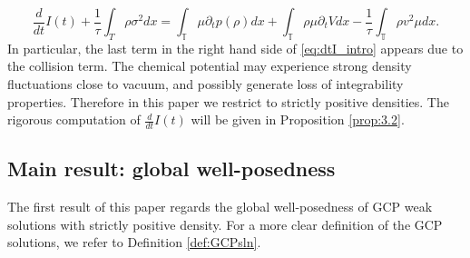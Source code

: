 \documentclass[leqno]{amsart}
\theoremstyle{plain}
\theoremstyle{definition}
\theoremstyle{remark}
\theoremstyle{plain}
\theoremstyle{plain}
\def\T{{\mathbb T}}%
\def\d{{\partial}}
\numberwithin{equation}{section}
\begin{document}
\begin{equation}\label{eq:dtI_intro}
\frac{d}{dt} I(t)+\frac{1}{\tau}\int_T\rho \sigma^2 dx=\int_\T \mu\d_tp(\rho)dx+\int_\T\rho\mu \d_tVdx-\frac{1}{\tau}\int_\T\rho v^2\mu dx.
\end{equation}
In particular, the last term in the right hand side of \eqref{eq:dtI_intro} appears due to the collision term. The chemical potential may experience strong density fluctuations close to vacuum,  and possibly generate loss of integrability properties. Therefore in this paper we restrict to strictly positive densities. The rigorous computation of $\frac{d}{dt} I(t)$ will be given in Proposition \ref{prop:3.2}.



\subsection{Main result: global well-posedness}

The first result of this paper regards the global well-posedness of GCP weak solutions with strictly positive density. For a more clear definition of the GCP solutions, we refer to Definition \ref{def:GCPsln}.
\end{document}
